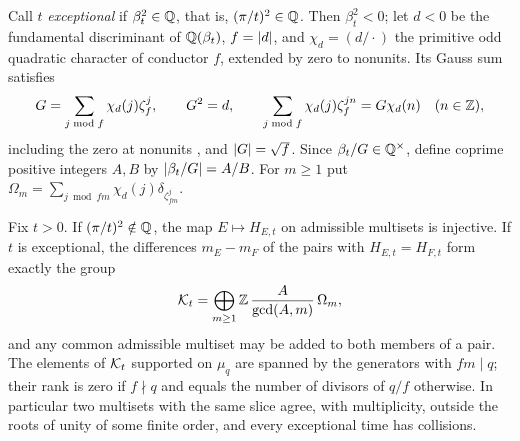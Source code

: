 Call $t$ \emph{exceptional} if $\beta_t^2\in\mathbb{Q}$, that is, $(\pi/t)^2\in\mathbb{Q}$. Then $\beta_t^2<0$; let $d<0$ be the
fundamental discriminant of $\mathbb{Q}(\beta_t)$, $f=\lvert d\rvert$, and $\chi_d=(d/\cdot)$ the primitive odd quadratic character of
conductor $f$, extended by zero to nonunits. Its Gauss sum satisfies
\[
 G=\sum_{j\bmod f}\chi_d(j)\zeta_f^j,\qquad G^2=d,\qquad\sum_{j\bmod f}\chi_d(j)\zeta_f^{jn}=G\chi_d(n)\quad(n\in\mathbb{Z}),
\]
including the zero at nonunits \cite{Davenport2000Multiplicative}, and $\lvert G\rvert=\sqrt f$. Since $\beta_t/G\in\mathbb{Q}^\times$,
define coprime positive integers $A,B$ by $\lvert\beta_t/G\rvert=A/B$. For $m\ge1$ put
$\Omega_m=\sum_{j\bmod fm}\chi_d(j)\delta_{\zeta_{fm}^j}$.

\begin{theorem}\label{li:thm:times}
Fix $t>0$. If $(\pi/t)^2\notin\mathbb{Q}$, the map $E\mapsto H_{E,t}$ on admissible multisets is injective. If $t$ is
exceptional, the differences $m_E-m_F$ of the pairs with $H_{E,t}=H_{F,t}$ form exactly the group
\begin{equation}\label{li:eq:lattice}
 \mathcal{K}_t=\bigoplus_{m\ge1}\mathbb{Z}\,\frac A{\gcd(A,m)}\,\Omega_m ,
\end{equation}
and any common admissible multiset may be added to both members of a pair. The elements of $\mathcal{K}_t$ supported
on $\mu_q$ are spanned by the generators with $fm\mid q$; their rank is zero if $f\nmid q$ and equals the number of
divisors of $q/f$ otherwise. In particular two multisets with the same slice agree, with multiplicity,
outside the roots of unity of some finite order, and every exceptional time has collisions.
\end{theorem}


